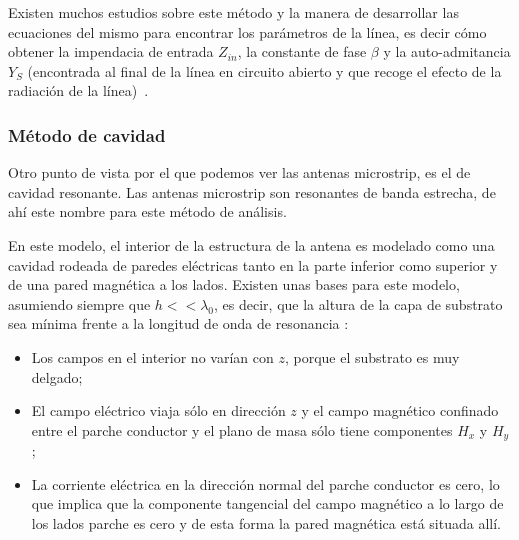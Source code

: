 Existen muchos estudios sobre este método y la manera de desarrollar las ecuaciones del mismo para encontrar los parámetros de la línea, es decir cómo obtener la impendacia de entrada $Z_{in}$, la constante de fase $\beta$ y la auto-admitancia $Y_{S}$ (encontrada al final de la línea en circuito abierto y que recoge el efecto de la radiación de la línea)~\cite{munson,derneryd,pues}.

\subsubsection{Método de cavidad}

Otro punto de vista por el que podemos ver las antenas microstrip, es el de cavidad resonante. Las antenas microstrip son resonantes de banda estrecha, de ahí este nombre para este método de análisis.

En este modelo, el interior de la estructura de la antena es modelado como una cavidad rodeada de paredes eléctricas tanto en la parte inferior como superior y de una pared magnética a los lados. Existen unas bases para este modelo, asumiendo siempre que $h << \lambda_{0}$, es decir, que la altura de la capa de substrato sea mínima frente a la longitud de onda de resonancia \cite{richards}:

\begin{itemize}
    \item Los campos en el interior no varían con $z$, porque el substrato es muy delgado;
    \item El campo eléctrico viaja sólo en dirección $z$ y el campo magnético confinado entre el parche conductor y el plano de masa sólo tiene componentes $H_{x}$ y $H_{y}$;
    \item La corriente eléctrica en la dirección normal del parche conductor es cero, lo que implica que la componente tangencial del campo magnético a lo largo de los lados parche es cero y de esta forma la pared magnética está situada allí.
\end{itemize}

